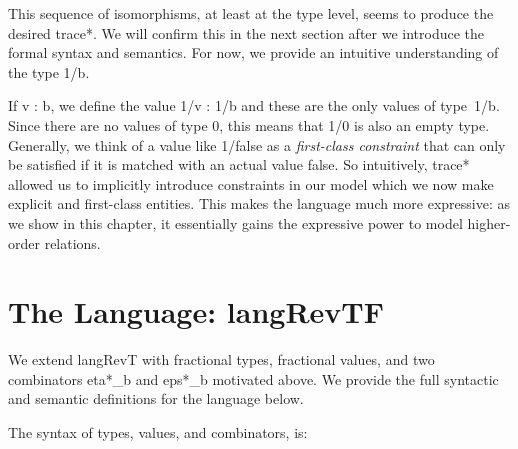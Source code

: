 \documentclass{llncs}
\begin{document}

\noindent This sequence of isomorphisms, at least at the type level,
seems to produce the desired {{trace*}}. We will confirm this in the
next section after we introduce the formal syntax and semantics. For
now, we provide an intuitive understanding of the type {{1/b}}.

If {{v : b}}, we define the value {{1/v : 1/b}} and these are the only
values of type~{{1/b}}. Since there are no values of type {{0}}, this
means that {{1/0}} is also an empty type. Generally, we think of a
value like {{1/false}} as a \emph{first-class constraint} that can
only be satisfied if it is matched with an actual value {{false}}. So
intuitively, {{trace*}} allowed us to implicitly introduce constraints
in our model which we now make explicit and first-class entities. This
makes the language much more expressive: as we show in this chapter,
it essentially gains the expressive power to model higher-order
relations.

\section{The Language: {{langRevTF}} }

We extend {{langRevT}} with fractional types, fractional values, and
two combinators {{eta*_b}} and {{eps*_b}} motivated above.  We provide the
full syntactic and semantic definitions for the language below.

\begin{definition}
\label{def:langRevT}
The syntax of types, values, and combinators, is:
%
\end{definition}
\end{document}
